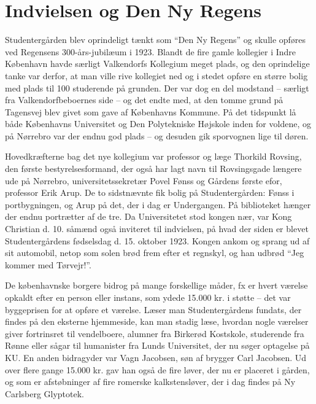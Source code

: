 \documentclass[11pt,article,twoside,openany,danish,extrafontsizes]{memoir} %
\begin{document}
\section{Indvielsen og Den Ny Regens}
Studentergården blev oprindeligt tænkt som \enquote{Den Ny Regens} og skulle opføres ved Regensens 300-års-jubilæum i 1923. Blandt de fire gamle kollegier i Indre København havde særligt Valkendorfs Kollegium meget plads, og den oprindelige tanke var derfor, at man ville rive kollegiet ned og i stedet opføre en større bolig med plads til 100 studerende på grunden. Der var dog en del modstand -- særligt fra Valkendorfbeboernes side -- og det endte med, at den tomme grund på Tagensvej blev givet som gave af Københavns Kommune. På det tidspunkt lå både Københavns Universitet og Den Polytekniske Højskole inden for voldene, og på Nørrebro var der endnu god plads -- og desuden gik sporvognen lige til døren.

Hovedkræfterne bag det nye kollegium var professor og læge Thorkild Rovsing, den første bestyrelsesformand, der også har lagt navn til Rovsingsgade længere ude på Nørrebro, universitetssekretær Povel Fønss og Gårdens første efor, professor Erik Arup. De to sidstnævnte fik bolig på Studentergården: Fønss i portbygningen, og Arup på det, der i dag er Undergangen. På biblioteket hænger der endnu portrætter af de tre. Da Universitetet stod kongen nær, var Kong Christian d. 10. såmænd også inviteret til indvielsen, på hvad der siden er blevet Studentergårdens fødselsdag d. 15. oktober 1923. Kongen ankom og sprang ud af sit automobil, netop som solen brød frem efter et regnskyl, og han udbrød \enquote{Jeg kommer med Tørvejr!}.

De københavnske borgere bidrog på mange forskellige måder, fx er hvert værelse opkaldt efter en person eller instans, som ydede 15.000 kr. i støtte -- det var byggeprisen for at opføre et værelse. Læser man Studentergårdens fundats, der findes på den eksterne hjemmeside, kan man stadig læse, hvordan nogle værelser giver fortrinsret til vendelboere, alumner fra Birkerød Kostskole, studerende fra Rønne eller sågar til humanister fra Lunds Universitet, der nu søger optagelse på KU. En anden bidragyder var Vagn Jacobsen, søn af brygger Carl Jacobsen. Ud over flere gange 15.000 kr. gav han også de fire løver, der nu er placeret i gården, og som er afstøbninger af fire romerske kalkstensløver, der i dag findes på Ny Carlsberg Glyptotek.
\end{document}

